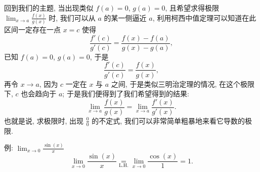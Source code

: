 \begin{tcolorbox}[size=fbox, breakable, enhanced jigsaw, title={洛必达法则 (L'Hôpital's
rule)}]
\begin{tcolorbox}[size=fbox, breakable, enhanced jigsaw, title={柯西中值定理 (Cauchy's mean value theorem)}]
\end{tcolorbox}

回到我们的主题, 当出现类似 $f(a)=0$, $g(a)=0$, 且希望求得极限
$\lim_{x\rightarrow a}\frac{f(x)}{g(x)}$ 时, 我们可以从 $a$
的某一侧逼近 $a$, 利用柯西中值定理可以知道在此区间一定存在一点 $x=c$
使得 \[
\frac{f'(c)}{g'(c)}=\frac{f(x)-f(a)}{g(x)-g(a)},
\] 已知 $f(a)=0$, $g(a)=0$, 于是 \[
\frac{f'(c)}{g'(c)}=\frac{f(x)}{g(x)},
\] 再令 $x\rightarrow a$, 因为 $c$ 一定在 $x$ 与 $a$ 之间,
于是类似三明治定理的情况, 在这个极限下, $c$ 也会趋向于 $a$;
于是我们便得到了我们希望得到的结果: \[
\boxed{\lim_{x\rightarrow a}\frac{f(x)}{g(x)}=\lim_{x\rightarrow a}\frac{f'(x)}{g'(x)}}.
\] 也就是说, 求极限时, 出现 $\frac{0}{0}$ 的不定式,
我们可以非常简单粗暴地来看它导数的极限.

\begin{newquote}
例: $\lim_{x\rightarrow 0}\frac{\sin(x)}{x}$ \[
\lim_{x\rightarrow 0}\frac{\sin(x)}{x}\underset{\text{L.H.}}{=}\lim_{x\rightarrow 0}\frac{\cos(x)}{1}=1.
\]
\end{newquote}

\end{tcolorbox}